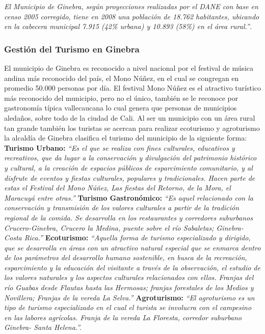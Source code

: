 \documentclass[12pt,letterpaper,openany]{book}
\begin{document}
\textit{El Municipio de Ginebra, según proyecciones realizadas por el DANE con base en censo 2005 corregido, tiene en 2008 una población de 18.762 habitantes, ubicando en la cabecera municipal 7.915 (42\% urbana) y 10.893 (58\%) en el área rural.''}\cite{4}.

\subsubsection{Gestión del Turismo en Ginebra}
El municipio de Ginebra es reconocido a nivel nacional por el festival de música andina más reconocido del país, el Mono Núñez, en el cual se congregan en promedio 50.000 personas por día. El festival Mono Núñez es el atractivo turístico más reconocido del municipio, pero no el único, también se le reconoce por gastronomía típica vallecaucana lo cual genera que personas de municipios aledaños, sobre todo de la ciudad de Cali\cite{3}. Al ser un municipio con un área rural tan grande también los turistas se acercan para realizar ecoturismo y agroturismo\cite{3}\cite{18} la alcaldía de Ginebra clasifica el turismo del municipio de la siguiente forma:
\vspace{5mm}\newline
\textbf{Turismo Urbano:} \textit{``Es el que se realiza con fines culturales, educativos y recreativos, que da lugar a la conservación y divulgación del patrimonio histórico y cultural, a la creación de espacios públicos de esparcimiento comunitario, y al disfrute de eventos y fiestas culturales, populares y tradicionales. Hacen parte de estas el Festival del Mono Núñez, Las fiestas del Retorno, de la Mora, el Maracuyá entre otras.''}
\vspace{5mm}\newline
\textbf{Turismo Gastronómico:} \textit{``Es aquel relacionado con la conservación y transmisión de los valores culturales a partir de la tradición regional de la comida. Se desarrolla en los restaurantes y corredores suburbanos Crucero-Ginebra, Crucero la Medina, puente sobre el río Sabaletas; Ginebra-Costa Rica.''}
\vspace{5mm}\newline
\textbf{Ecoturismo:} \textit{``Aquella forma de turismo especializado y dirigido, que se desarrolla en áreas con un atractivo natural especial que se enmarca dentro de los parámetros del desarrollo humano sostenible, en busca de la recreación, esparcimiento y la educación del visitante a través de la observación, el estudio de los valores naturales y los aspectos culturales relacionados con ellos. Franjas del río Guabas desde Flautas hasta las Hermosas; franjas forestales de los Medios y Novillera; Franjas de la vereda La Selva.''}
\vspace{5mm}\newline
\textbf{Agroturismo:} \textit{``El agroturismo es un tipo de turismo especializado en el cual el turista se involucra con el campesino en las labores agrícolas. Franja de la vereda La Floresta, corredor suburbano Ginebra- Santa Helena.''\cite{18}.}
\end{document}
